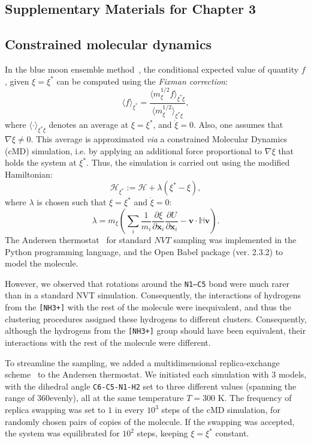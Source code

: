 \documentclass[a4paper,11pt,twoside]{book}%
\begin{document}
\begin{appendices}
\chapter{Supplementary Materials for Chapter 3}
\section{Constrained molecular dynamics}\label{sec:appendixA}

In the blue moon ensemble method~\cite{carter1989constrained}, the conditional expected value of quantity $f$, given $\xi=\xi^*$ can be computed using the \emph{Fixman correction}:
\begin{equation}\label{eq:fixman}
 \langle f \rangle_{\xi^*} = \frac{\langle m_\xi^{1/2} f \rangle_{\xi^*\dot{\xi}}}{\langle m_\xi^{1/2} \rangle_{\xi^*\dot{\xi}}},
\end{equation}
where $\langle \cdot \rangle_{\xi^*\dot{\xi}}$ denotes an average at $\xi=\xi^*$, and $\dot{\xi}=0$. 
Also, one assumes that \mbox{$\nabla\xi\neq0$}.
This average is approximated \emph{via} a constrained Molecular Dynamics (cMD) simulation, i.e. by applying an additional force proportional to $\nabla\xi$ that holds the system at $\xi^*$.
Thus, the simulation is carried out using the modified Hamiltonian:
$$
\mathcal{H}_{\xi^*} := \mathcal{H} + \lambda (\xi^* - \xi),
$$
where $\lambda$ is chosen such that $\xi=\xi^*$ and $\dot{\xi}=0$:
$$
\lambda = m_\xi \left( \sum_i \frac{1}{m_i}\frac{\partial\xi}{\partial\mathbf{x}_i}\frac{\partial U}{\partial\mathbf{x}_i} - \mathbf{v}\cdot\mathbb{H}\mathbf{v} \right).
$$
The Andersen thermostat~\cite{den2013revisiting} for standard $NVT$ sampling was implemented in the Python programming language, and the Open Babel package (ver. 2.3.2) to model the molecule.

However, we observed that rotations around the \texttt{N1--C5} bond were much rarer than in a standard NVT simulation.
Consequently, the interactions of hydrogens from the \texttt{[NH3+]} with the rest of the molecule were inequivalent, and thus the clustering procedures assigned these hydrogens to different clusters.
Consequently, although the hydrogens from the \texttt{[NH3+]} group should have been equivalent, their interactions with the rest of the molecule were different.

To streamline the sampling, we added a multidimensional replica-exchange scheme~\cite{sugita2000multidimensional} to the Andersen thermostat.
We initiated each simulation with 3 models, with the dihedral angle \texttt{C6-C5-N1-H2} set to three different values (spanning the range of 360\degree evenly), all at the same temperature $T=300$ K.
The frequency of replica swapping was set to $1$ in every $10^3$ steps of the cMD simulation, for randomly chosen pairs of copies of the molecule.
If the swapping was accepted, the system was equilibrated for $10^2$ steps, keeping $\xi=\xi^*$ constant.


\end{appendices}
\end{document}
